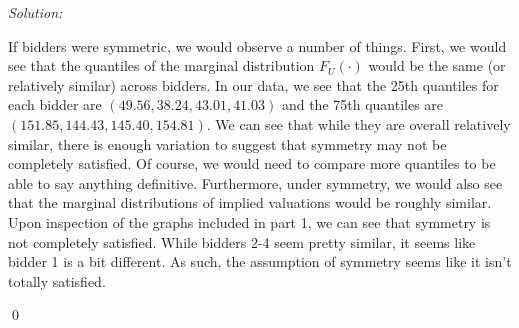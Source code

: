 \documentclass[12pt]{article}
\newenvironment{problem}[2][Problem]{\begin{trivlist}
\item[\hskip \labelsep {\bfseries #1}\hskip \labelsep {\bfseries #2.}]}{\end{trivlist}}
\newenvironment{sol}
    {\emph{Solution:}
    }
    {
    \qed
    }
\begin{document}
\begin{problem}{3}
\end{problem}
\begin{sol}
If bidders were symmetric, we would observe a number of things. First, we would see that the quantiles of the marginal distribution $F_U(\cdot)$ would be the same (or relatively similar) across bidders. In our data, we see that the 25th quantiles for each bidder are $(49.56, 38.24, 43.01, 41.03)$ and the 75th quantiles are $(151.85, 144.43, 145.40, 154.81)$. We can see that while they are overall relatively similar, there is enough variation to suggest that symmetry may not be completely satisfied. Of course, we would need to compare more quantiles to be able to say anything definitive. Furthermore, under symmetry, we would also see that the marginal distributions of implied valuations would be roughly similar. Upon inspection of the graphs included in part 1, we can see that symmetry is not completely satisfied. While bidders 2-4 seem pretty similar, it seems like bidder 1 is a bit different. As such, the assumption of symmetry seems like it isn't totally satisfied.
\end{sol}
\begin{problem}{4}
\end{problem}
\end{document}
